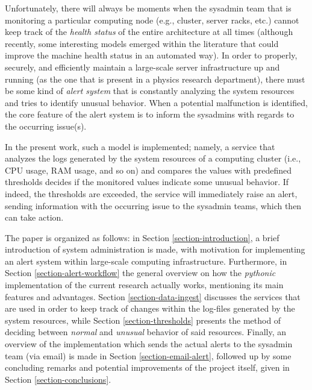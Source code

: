 \documentclass[conference]{IEEEtran}
\begin{document}
\par Unfortunately, there will always be moments when the sysadmin team that is monitoring a particular computing node (e.g., cluster, server racks, etc.) cannot keep track of the \emph{health status} of the entire architecture at all times (although recently, some interesting models emerged within the literature that could improve the machine health status \cite{hasani2019machine,lin2020health} in an automated way). In order to properly, securely, and efficiently maintain a large-scale server infrastructure up and running (as the one that is present in a physics research department), there must be some kind of \emph{alert system} that is constantly analyzing the system resources and tries to identify unusual behavior. When a potential malfunction is identified, the core feature of the alert system is to inform the sysadmins with regards to the occurring issue(s).
\par In the present work, such a model is implemented; namely, a service that analyzes the logs generated by the system resources of a computing cluster (i.e., CPU usage, RAM usage, and so on) and compares the values with predefined thresholds decides if the monitored values indicate some unusual behavior. If indeed, the thresholds are exceeded, the service will immediately raise an alert, sending information with the occurring issue to the sysadmin teams, which then can take action.
\par The paper is organized as follows: in Section \ref{section-introduction}, a brief introduction of system administration is made, with motivation for implementing an alert system within large-scale computing infrastructure. Furthermore, in Section \ref{section-alert-workflow} the general overview on how the \emph{pythonic} implementation of the current research actually works, mentioning its main features and advantages. Section \ref{section-data-ingest} discusses the services that are used in order to keep track of changes within the log-files generated by the system resources, while Section \ref{section-thresholds} presents the method of deciding between \emph{normal} and \emph{unusual} behavior of said resources. Finally, an overview of the implementation which sends the actual alerts to the sysadmin team (via email) is made in Section \ref{section-email-alert}, followed up by some concluding remarks and potential improvements of the project itself, given in Section \ref{section-conclusions}.
\end{document}
